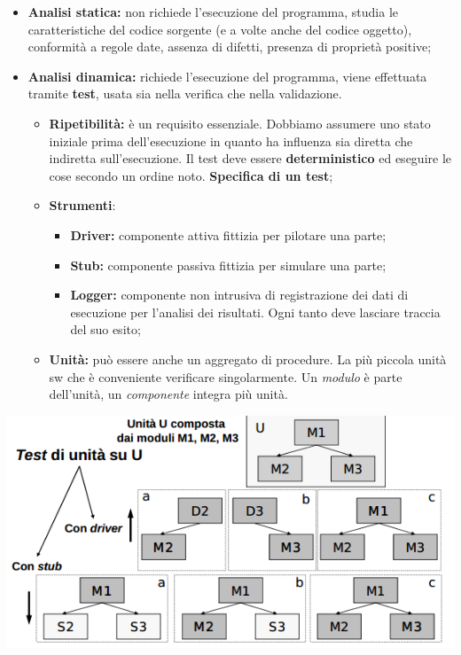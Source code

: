 \begin{itemize}

	\item \textbf{Analisi statica:} non richiede l'esecuzione del programma, studia le caratteristiche del codice sorgente (e a volte anche del codice oggetto), conformità a regole date, assenza di difetti, presenza di proprietà positive;
	\item \textbf{Analisi dinamica:} richiede l'esecuzione del programma, viene effettuata tramite \textbf{test}, usata sia nella verifica che nella validazione.						\begin{itemize}

			\item \textbf{Ripetibilità:} è un requisito essenziale. Dobbiamo assumere uno stato iniziale prima dell'esecuzione in quanto ha influenza sia diretta che indiretta sull'esecuzione. Il test deve essere \textbf{deterministico} ed eseguire le cose secondo un ordine noto. \textbf{Specifica di un test};
			\item \textbf{Strumenti}:
				\begin{itemize}

					\item \textbf{Driver:} componente attiva fittizia per pilotare una parte;
					\item \textbf{Stub:} componente passiva fittizia per simulare una parte;
					\item \textbf{Logger:} componente non intrusiva di registrazione dei dati di esecuzione per l'analisi dei risultati. Ogni tanto deve lasciare traccia del suo esito;	
	
				\end{itemize}
			\item \textbf{Unità:} può essere anche un aggregato di procedure. La più piccola unità sw che è conveniente verificare singolarmente. Un \textit{modulo} è parte dell'unità, un \textit{componente} integra più unità.

		\end{itemize}

\end{itemize}

\includegraphics[width=0.5\columnwidth]{img3} %

